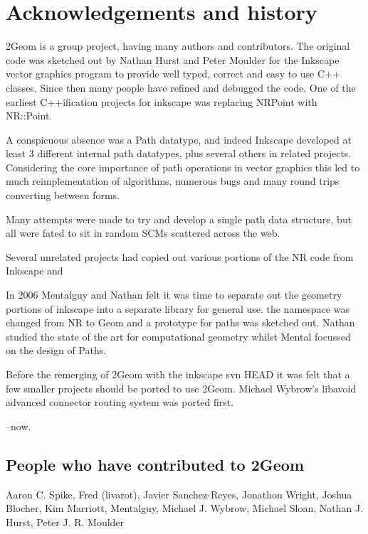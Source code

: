 \section{Acknowledgements and history}

2Geom is a group project, having many authors and contributors.  The
original code was sketched out by Nathan Hurst and Peter Moulder for
the Inkscape vector graphics program to provide well typed, correct
and easy to use C++ classes.  Since then many people have refined and
debugged the code.  One of the earliest C++ification projects for
inkscape was replacing NRPoint with NR::Point.

A conspicuous absence was a Path datatype, and indeed Inkscape
developed at least 3 different internal path datatypes, plus several
others in related projects.  Considering the core importance of path
operations in vector graphics this led to much reimplementation of
algorithms, numerous bugs and many round trips converting between
forms.

Many attempts were made to try and develop a single path data
structure, but all were fated to sit in random SCMs scattered across
the web.

Several unrelated projects had copied out various portions of the NR
code from Inkscape and 

In 2006 Mentalguy and Nathan felt it was time to separate out
the geometry portions of inkscape into a separate library for general
use.  the namespace was changed from NR to Geom and a prototype for
paths was sketched out.  Nathan studied the state of the art for
computational geometry whilst Mental focussed on the design of Paths.

Before the remerging of 2Geom with the inkscape svn HEAD it was felt
that a few smaller projects should be ported to use 2Geom.  Michael
Wybrow's libavoid advanced connector routing system was ported first.

--now.

\subsection{People who have contributed to 2Geom}

Aaron C. Spike,
Fred (livarot),
Javier Sanchez-Reyes,
Jonathon Wright,
Joshua Blocher,
Kim Marriott,
Mentalguy,
Michael J. Wybrow,
Michael Sloan,
Nathan J. Hurst,
Peter J. R. Moulder

